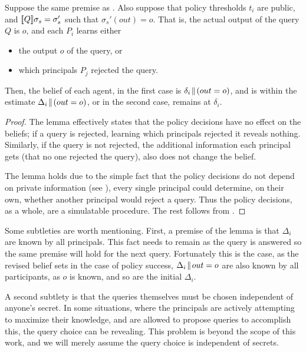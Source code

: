 \documentclass[10pt]{sigplanconf}
\begin{document}
\begin{lemma}
\label{lem:sound-sets}
Suppose the same premise as . Also suppose that
policy thresholds $t_i$ are public, and $[\![{Q}]\!]{\sigma_s} = \sigma_s'$
such that $\sigma_s'(out) = o$. That is, the actual output of the
query $Q$ is $o$, and each $P_i$ learns either
\begin{itemize}
\item the output $ o $ of the query, or
\item which principals $P_j$ rejected the query.
\end{itemize}
Then, the belief of each agent, in the first case is
$ \delta_i\!\parallel\!{(out = o)} $, and is within the estimate
$ \Delta_i\!\parallel\!{(out = o)} $, or in the second case, remains at
$ \delta_i $.
\end{lemma}
\begin{proof} The lemma effectively states that the policy decisions
have no effect on the beliefs; if a query is
rejected, learning which principals rejected it reveals
nothing. Similarly, if the query is not rejected, the additional
information each principal gets (that no one rejected the query), also
does not change the belief.

The lemma holds due to the simple fact that the policy decisions do
not depend on private information (see ),
every single principal could determine, on their own, whether another
principal would reject a query. Thus the policy decisions, as a whole,
are a simulatable procedure. The rest follows
from .
\end{proof}

Some subtleties are worth mentioning.  First, a premise of the lemma is that
$ \Delta_i $ are known by all principals. This fact
needs to remain as the query is answered so the same premise will
hold for the next query. Fortunately this is the case, as the revised belief
sets in the case of policy success, $ \Delta_i\!\parallel\!{out = o} $ are
also known by all participants, as $ o $ is known, and so are the
initial $ \Delta_i $.

A second subtlety is that the queries themselves must be chosen
independent of anyone's secret. In some situations, where the
principals are actively attempting to maximize their knowledge, and
are allowed to propose queries to accomplish this, the query choice
can be revealing. This problem is beyond the scope of this work, and
we will merely assume the query choice is independent of secrets.
\end{document}
